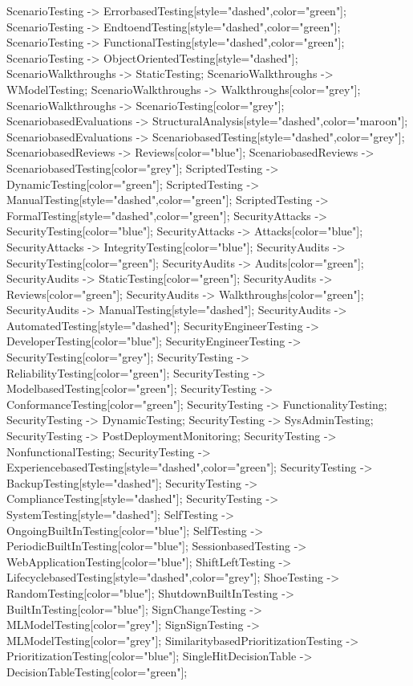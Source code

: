 \documentclass{article}
\begin{document}
{ScenarioTesting -> ErrorbasedTesting[style="dashed",color="green"];
ScenarioTesting -> EndtoendTesting[style="dashed",color="green"];
ScenarioTesting -> FunctionalTesting[style="dashed",color="green"];
ScenarioTesting -> ObjectOrientedTesting[style="dashed"];
ScenarioWalkthroughs -> StaticTesting;
ScenarioWalkthroughs -> WModelTesting;
ScenarioWalkthroughs -> Walkthroughs[color="grey"];
ScenarioWalkthroughs -> ScenarioTesting[color="grey"];
ScenariobasedEvaluations -> StructuralAnalysis[style="dashed",color="maroon"];
ScenariobasedEvaluations -> ScenariobasedTesting[style="dashed",color="grey"];
ScenariobasedReviews -> Reviews[color="blue"];
ScenariobasedReviews -> ScenariobasedTesting[color="grey"];
ScriptedTesting -> DynamicTesting[color="green"];
ScriptedTesting -> ManualTesting[style="dashed",color="green"];
ScriptedTesting -> FormalTesting[style="dashed",color="green"];
SecurityAttacks -> SecurityTesting[color="blue"];
SecurityAttacks -> Attacks[color="blue"];
SecurityAttacks -> IntegrityTesting[color="blue"];
SecurityAudits -> SecurityTesting[color="green"];
SecurityAudits -> Audits[color="green"];
SecurityAudits -> StaticTesting[color="green"];
SecurityAudits -> Reviews[color="green"];
SecurityAudits -> Walkthroughs[color="green"];
SecurityAudits -> ManualTesting[style="dashed"];
SecurityAudits -> AutomatedTesting[style="dashed"];
SecurityEngineerTesting -> DeveloperTesting[color="blue"];
SecurityEngineerTesting -> SecurityTesting[color="grey"];
SecurityTesting -> ReliabilityTesting[color="green"];
SecurityTesting -> ModelbasedTesting[color="green"];
SecurityTesting -> ConformanceTesting[color="green"];
SecurityTesting -> FunctionalityTesting;
SecurityTesting -> DynamicTesting;
SecurityTesting -> SysAdminTesting;
SecurityTesting -> PostDeploymentMonitoring;
SecurityTesting -> NonfunctionalTesting;
SecurityTesting -> ExperiencebasedTesting[style="dashed",color="green"];
SecurityTesting -> BackupTesting[style="dashed"];
SecurityTesting -> ComplianceTesting[style="dashed"];
SecurityTesting -> SystemTesting[style="dashed"];
SelfTesting -> OngoingBuiltInTesting[color="blue"];
SelfTesting -> PeriodicBuiltInTesting[color="blue"];
SessionbasedTesting -> WebApplicationTesting[color="blue"];
ShiftLeftTesting -> LifecyclebasedTesting[style="dashed",color="grey"];
ShoeTesting -> RandomTesting[color="blue"];
ShutdownBuiltInTesting -> BuiltInTesting[color="blue"];
SignChangeTesting -> MLModelTesting[color="grey"];
SignSignTesting -> MLModelTesting[color="grey"];
SimilaritybasedPrioritizationTesting -> PrioritizationTesting[color="blue"];
SingleHitDecisionTable -> DecisionTableTesting[color="green"];
}
\end{document}
